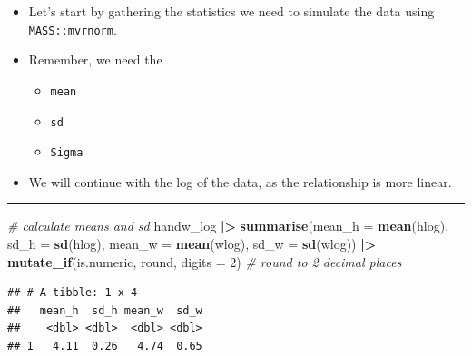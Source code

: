 \documentclass[
]{article}
\newenvironment{Shaded}{\begin{snugshade}}{\end{snugshade}}
\newcommand{\AttributeTok}[1]{\textcolor[rgb]{0.13,0.29,0.53}{#1}}
\newcommand{\CommentTok}[1]{\textcolor[rgb]{0.56,0.35,0.01}{\textit{#1}}}
\newcommand{\DecValTok}[1]{\textcolor[rgb]{0.00,0.00,0.81}{#1}}
\newcommand{\FunctionTok}[1]{\textcolor[rgb]{0.13,0.29,0.53}{\textbf{#1}}}
\newcommand{\NormalTok}[1]{#1}
\newcommand{\SpecialCharTok}[1]{\textcolor[rgb]{0.81,0.36,0.00}{\textbf{#1}}}
\providecommand{\tightlist}{%
  \setlength{\itemsep}{0pt}\setlength{\parskip}{0pt}}
\begin{document}
\begin{itemize}
\tightlist
\item
  Let's start by gathering the statistics we need to simulate the data
  using \texttt{MASS::mvrnorm}.
\item
  Remember, we need the

  \begin{itemize}
  \tightlist
  \item
    \texttt{mean}
  \item
    \texttt{sd}
  \item
    \texttt{Sigma}
  \end{itemize}
\item
  We will continue with the log of the data, as the relationship is more
  linear.
\end{itemize}

\begin{center}\rule{0.5\linewidth}{0.5pt}\end{center}

\begin{Shaded}
\begin{Highlighting}[]
\CommentTok{\# calculate means and sd}
\NormalTok{handw\_log }\SpecialCharTok{|\textgreater{}}
  \FunctionTok{summarise}\NormalTok{(}\AttributeTok{mean\_h =} \FunctionTok{mean}\NormalTok{(hlog),}
            \AttributeTok{sd\_h =} \FunctionTok{sd}\NormalTok{(hlog),}
            \AttributeTok{mean\_w =} \FunctionTok{mean}\NormalTok{(wlog),}
            \AttributeTok{sd\_w =} \FunctionTok{sd}\NormalTok{(wlog)) }\SpecialCharTok{|\textgreater{}}
  \FunctionTok{mutate\_if}\NormalTok{(is.numeric, round, }\AttributeTok{digits =} \DecValTok{2}\NormalTok{) }\CommentTok{\# round to 2 decimal places}
\end{Highlighting}
\end{Shaded}

\begin{verbatim}
## # A tibble: 1 x 4
##   mean_h  sd_h mean_w  sd_w
##    <dbl> <dbl>  <dbl> <dbl>
## 1   4.11  0.26   4.74  0.65
\end{verbatim}

\begin{Shaded}
\end{Shaded}
\end{document}
